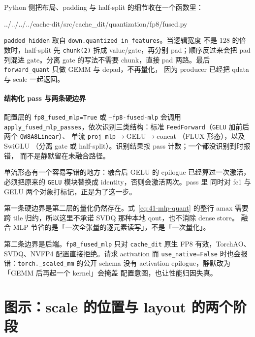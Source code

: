Python 侧把布局、padding 与 half-split 的细节收在一个函数里：

\begin{lstinputlisting}[linerange={73-104},firstnumber=auto,
  title={cache-dit quantization/fp8/fused.py L73--104（SwiGLU 的 Python 入口）}]{../../../../cache-dit/src/cache_dit/quantization/fp8/fused.py}
\end{lstinputlisting}

\texttt{padded\_hidden} 取自 \texttt{down.quantized\_in\_features}。当逻辑宽度
不是 128 的倍数时，half-split 先 \texttt{chunk(2)} 拆成 value/gate，再分别
pad；顺序反过来会把 pad 列混进 gate。分离 gate 的写法不需要 chunk，直接 pad
两路。最后 \texttt{forward\_quant} 只做 GEMM 与 depad，不再量化，
因为 producer 已经把 qdata 与 scale 一起返回。

\paragraph{结构化 pass 与两条硬边界}

配置层的 \texttt{fp8\_fused\_mlp=True} 或 \texttt{--fp8-fused-mlp} 会调用
\texttt{apply\_fused}\allowbreak\texttt{\_mlp\_passes}，依次识别三类结构：标准
\texttt{FeedForward}（\texttt{GELU} 加前后两个 \texttt{QW8A8Linear}）、
单流 \texttt{proj\_mlp}\allowbreak$\to$GELU\allowbreak$\to$concat
（FLUX 形态），以及 SwiGLU
（分离 gate 或 half-split）。识别结果按 pass 计数；一个都没识别到时报错，
而不是静默留在未融合路径。

单流形态有一个容易写错的地方：融合后 GELU 的 epilogue 已经算过一次激活，
必须把原来的 \texttt{GELU} 模块替换成 identity，否则会激活两次。pass 里
同时对 fc1 与 GELU 两个对象打标记，正是为了这一步。

第一条硬边界是第二层的量化仍然存在。式~\ref{eq:41-mlp-quant} 的整行 amax
需要跨 tile 归约，所以这里不承诺 SVDQ 那种本地 qout，也不消除 dense store。
融合 MLP 节省的是「一次全张量的逐元素读写」，不是「一次量化」。

第二条边界是后端。\texttt{fp8\_fused\_mlp} 只对 \texttt{cache\_dit} 原生 FP8
有效，TorchAO、SVDQ、NVFP4 配置直接拒绝。请求 activation 而
\texttt{use\_native=False} 时也会报错：\texttt{torch.\_scaled\_mm} 的公开
schema 没有 activation epilogue，静默改为「GEMM 后再起一个 kernel」会掩盖
配置意图，也让性能归因失真。

\section{图示：scale 的位置与 layout 的两个阶段}

